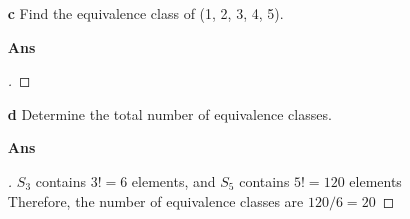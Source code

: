 \documentclass[paper=usletter, fontsize=12pt]{article}
\begin{document}
\begin{itemize}
\begin{itemize}
\begin{itemize}
                \item[\textbf{c}] Find the equivalence class of (1, 2, 3, 4, 5).
                \item[\textbf{Ans}]
                \begin{proof}[\unskip\nopunct]
                \end{proof}
                \vspace{0.2in}

                \item[\textbf{d}] Determine the total number of equivalence
                classes.
                \item[\textbf{Ans}]
                \begin{proof}[\unskip\nopunct]
                    $S_3$ contains $3!=6$ elements, and $S_5$ contains $5!=120$
                    elements\\ Therefore, the number of equivalence classes are
                    $120/6=20$ \qedhere
                \end{proof}
                \vspace{0.2in}

            \end{itemize}

        \end{itemize}

    \end{itemize}
\end{document}
